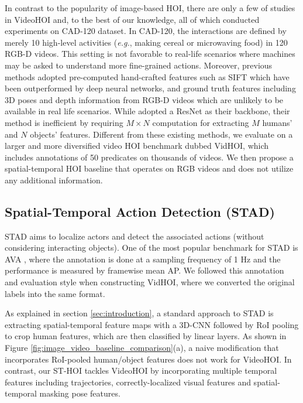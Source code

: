 \documentclass[sigconf]{acmart}
\begin{document}
In contrast to the popularity of image-based HOI, there are only a few of studies in VideoHOI \cite{koppula2015anticipating,jain2016structural,qi2018learning,sunkesula2020lighten} and, to the best of our knowledge, all of which conducted experiments on CAD-120 \cite{koppula2013learning} dataset.
In CAD-120, the interactions are defined by merely 10 high-level activities (\emph{e.g.}, {\selectfont making cereal} or {\selectfont microwaving food}) in 120 RGB-D videos. This setting is not favorable to real-life scenarios where machines may be asked to understand more fine-grained actions.
Moreover, previous methods \cite{koppula2015anticipating,jain2016structural,qi2018learning} adopted pre-computed hand-crafted features such as SIFT \cite{lowe2004distinctive} which have been outperformed by deep neural networks, and ground truth features including 3D poses and depth information from RGB-D videos which are unlikely to be available in real life scenarios.
While \cite{sunkesula2020lighten} adopted a ResNet \cite{he2016deep} as their backbone, their method is inefficient by requiring $M \times N$ computation for extracting $M$ humans' and $N$ objects' features. 
Different from these existing methods, we evaluate on a larger and more diversified video HOI benchmark dubbed VidHOI, which includes annotations of 50 predicates on thousands of videos. 
We then propose a spatial-temporal HOI baseline that operates on RGB videos and does not utilize any additional information.

\subsection{Spatial-Temporal Action Detection (STAD)}
\label{subsec:stad}
STAD aims to localize actors and detect the associated actions (without considering interacting objects). 
One of the most popular benchmark for STAD is AVA \cite{gu2018ava}, where the annotation is done at a sampling frequency of 1 Hz and the performance is measured by framewise mean AP. 
We followed this annotation and evaluation style when constructing VidHOI, where we converted the original labels into the same format. 

As explained in section \ref{sec:introduction}, a standard approach to STAD \cite{tran2015learning,carreira2017quo} is extracting spatial-temporal feature maps with a 3D-CNN followed by RoI pooling to crop human features, which are then classified by linear layers. 
As shown in Figure \ref{fig:image_video_baseline_comparison}(a), a naive modification that incorporates RoI-pooled human/object features does not work for VideoHOI.
In contrast, our ST-HOI tackles VideoHOI by incorporating multiple temporal features including trajectories, correctly-localized visual features and spatial-temporal masking pose features.
\end{document}
